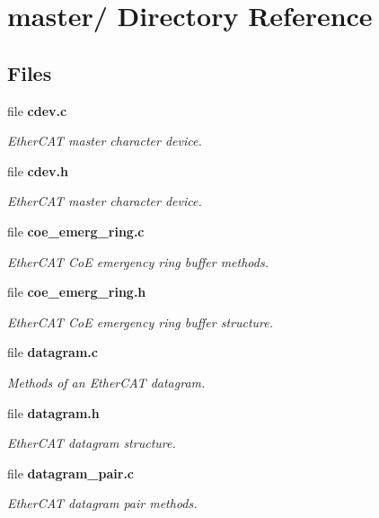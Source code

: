 \section{master/ Directory Reference}
\label{dir_c1346cf4828efdd0d2baf0d391d01b77}
\subsection*{Files}
\begin{DoxyCompactItemize}
\item 
file {\bf cdev.\-c}
\begin{DoxyCompactList}\small\item\em Ether\-C\-A\-T master character device. \end{DoxyCompactList}\item 
file {\bf cdev.\-h}
\begin{DoxyCompactList}\small\item\em Ether\-C\-A\-T master character device. \end{DoxyCompactList}\item 
file {\bf coe\-\_\-emerg\-\_\-ring.\-c}
\begin{DoxyCompactList}\small\item\em Ether\-C\-A\-T Co\-E emergency ring buffer methods. \end{DoxyCompactList}\item 
file {\bf coe\-\_\-emerg\-\_\-ring.\-h}
\begin{DoxyCompactList}\small\item\em Ether\-C\-A\-T Co\-E emergency ring buffer structure. \end{DoxyCompactList}\item 
file {\bf datagram.\-c}
\begin{DoxyCompactList}\small\item\em Methods of an Ether\-C\-A\-T datagram. \end{DoxyCompactList}\item 
file {\bf datagram.\-h}
\begin{DoxyCompactList}\small\item\em Ether\-C\-A\-T datagram structure. \end{DoxyCompactList}\item 
file {\bf datagram\-\_\-pair.\-c}
\begin{DoxyCompactList}\small\item\em Ether\-C\-A\-T datagram pair methods. \end{DoxyCompactList}\item 

\end{DoxyCompactItemize}

